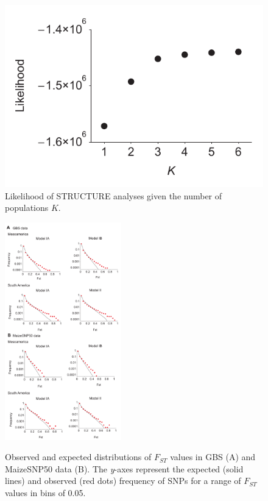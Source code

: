 \begin{figure}[h]
  \begin{center}
    \includegraphics[width=0.4\columnwidth]{fig/kk.pdf}
    \caption{Likelihood of STRUCTURE analyses given the number of populations $K$.}
    \label{supp:struct}
  \end{center}
\end{figure}

\begin{figure}[h]   
  \begin{center}
   \vspace{-0mm}
   \includegraphics[width=0.45\textwidth]{fig/Fig5}
   \renewcommand{\baselinestretch}{0.9}
   \vspace{-3mm}
   \caption{Observed and expected distributions of $F_{ST}$ values in GBS (A) and MaizeSNP50 data (B).   The \emph{y}-axes represent the expected (solid lines) and observed (red dots) frequency of SNPs for a range of $F_{ST}$ values in bins of 0.05. 
   }
\vspace{-6mm}
    \label{FstDist}
  \end{center}
\end{figure}

